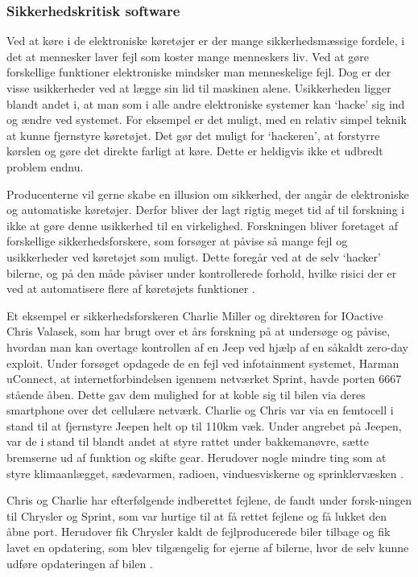 \subsubsection{Sikkerhedskritisk software}
Ved at køre i de elektroniske køretøjer er der mange sikkerhedsmæssige fordele, i det at mennesker laver fejl som koster mange menneskers liv. Ved at gøre forskellige funktioner elektroniske mindsker man menneskelige fejl. Dog er der visse usikkerheder ved at lægge sin lid til maskinen alene. Usikkerheden ligger blandt andet i, at man som i alle andre elektroniske systemer kan `hacke' sig ind og ændre ved systemet. For eksempel er det muligt, med en relativ simpel teknik at kunne fjernstyre køretøjet. Det gør det muligt for `hackeren', at forstyrre kørslen og gøre det direkte farligt at køre. Dette er heldigvis ikke et udbredt problem endnu.  

Producenterne vil gerne skabe en illusion om sikkerhed, der angår de elektroniske og automatiske køretøjer. Derfor bliver der lagt rigtig meget tid af til forskning i ikke at gøre denne usikkerhed til en virkelighed. Forskningen bliver foretaget af forskellige sikkerhedsforskere, som forsøger at påvise så mange fejl og usikkerheder ved køretøjet som muligt. Dette foregår ved at de selv `hacker' bilerne, og på den måde påviser under kontrollerede forhold, hvilke risici der er ved at automatisere flere af køretøjets funktioner \cite{Jeep1}.

Et eksempel er sikkerhedsforskeren Charlie Miller og direktøren for IOactive Chris Valasek, som har brugt over et års forskning på at undersøge og påvise, hvordan man kan overtage kontrollen af en Jeep ved hjælp af en såkaldt zero-day exploit. Under forsøget opdagede de en fejl ved infotainment systemet, Harman uConnect, at internetforbindelsen igennem netværket Sprint, havde porten 6667 stående åben. Dette gav dem mulighed for at koble sig til bilen via deres smartphone over det cellulære netværk. Charlie og Chris var via en femtocell i stand til at fjernstyre Jeepen helt op til 110km væk. Under angrebet på Jeepen, var de i stand til blandt andet at styre rattet under bakkemanøvre, sætte bremserne ud af funktion og skifte gear. Herudover nogle mindre ting som at styre klimaanlægget, sædevarmen, radioen, vinduesviskerne og sprinklervæsken \cite{Jeep1}\cite{Jeep2}.

Chris og Charlie har efterfølgende indberettet fejlene, de fandt under forsk-ningen til Chrysler og Sprint, som var hurtige til at få rettet fejlene og få lukket den åbne port. Herudover fik Chrysler kaldt de fejlproducerede biler tilbage og fik lavet en opdatering, som blev tilgængelig for ejerne af bilerne, hvor de selv kunne udføre opdateringen af bilen \cite{Jeep1}.  


